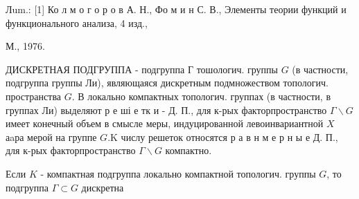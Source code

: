 \documentclass[10pt]{article}
\begin{document}
Лum.: [1] Ко л м о г о р о в А. Н., Фо м и н С. В., Элементы теории функций и функционального анализа, 4 изд.,

М., 1976.



ДИСКРЕТНАЯ ПОДГРУППА - подгруппа Г тошологич. группы $G$ (в частности, подгруппа группы Ли), являющаяся дискретным подмножеством топологич. пространства $G$. В локально компактных топологич. группах (в частности, в группах Ли) выделяют р е ші е тк и - Д. П., для к-рых факторпространство $\Gamma \backslash G$ имеет конечный объем в смысле меры, индуцированной левоинвариантной $X$ аaра мерой на группе $G . \mathrm{K}$ числу решеток относятся р а в н м е р н ы е Д. П., для к-рых факторпространство $\Gamma \backslash G$ компактно.



Если $K$ - компактная подгруппа локально компактной топологич. группы $G$, то подгруппа $\Gamma \subset G$ дискретна
\end{document}
